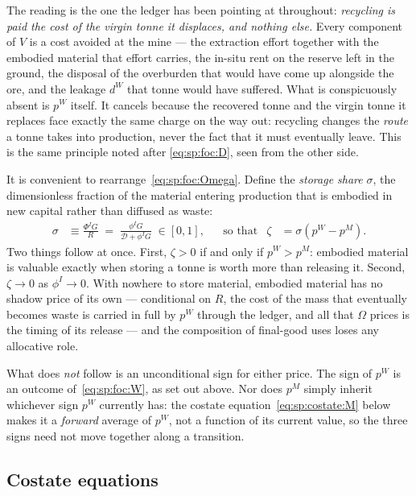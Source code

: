 The reading is the one the ledger has been pointing at throughout: \emph{recycling is paid the cost
of the virgin tonne it displaces, and nothing else.} Every component of $V$ is a cost avoided at the
mine --- the extraction effort together with the embodied material that effort carries, the in-situ
rent on the reserve left in the ground, the disposal of the overburden that would have come up
alongside the ore, and the leakage $d^W$ that tonne would have suffered. What is conspicuously
absent is $p^W$ itself. It cancels because the recovered tonne and the virgin tonne it replaces face
exactly the same charge on the way out: recycling changes the \emph{route} a tonne takes into
production, never the fact that it must eventually leave. This is the same principle noted after
\eqref{eq:sp:foc:D}, seen from the other side.


 It is convenient to rearrange~\eqref{eq:sp:foc:Omega}. Define the \emph{storage share} $\sigma$, the dimensionless fraction of the material entering production that is embodied in new capital rather than diffused as waste:
\begin{align}
\sigma &\equiv \frac{\Phi^IG}{R} \;=\; \frac{\phi^IG}{\mathcal D+\phi^IG}\;\in\left[0,1\right],
&&\text{so that}
&
\zeta &= \sigma\left(p^W-p^M\right).
\label{eq:sp:zeta-explicit}
\end{align}
Two things follow at once. First, $\zeta>0$ if and only if $p^W>p^M$: embodied material is valuable exactly when storing a tonne is worth more than releasing it. Second, $\zeta\to0$ as $\phi^I\to0$. With nowhere to store material, embodied material has no shadow price of its own --- conditional on $R$, the cost of the mass that eventually becomes waste is carried in full by $p^W$ through the ledger, and all that $\Omega$ prices is the timing of its release --- and the composition of final-good uses loses any allocative role.

What does \emph{not} follow is an unconditional sign for either price. The sign of $p^W$ is an outcome of~\eqref{eq:sp:foc:W}, as set out above. Nor does $p^M$ simply inherit whichever sign $p^W$ currently has: the costate equation~\eqref{eq:sp:costate:M} below makes it a \emph{forward} average of $p^W$, not a function of its current value, so the three signs need not move together along a transition.

\subsection{Costate equations}\label{sec:app:sp:costates}

